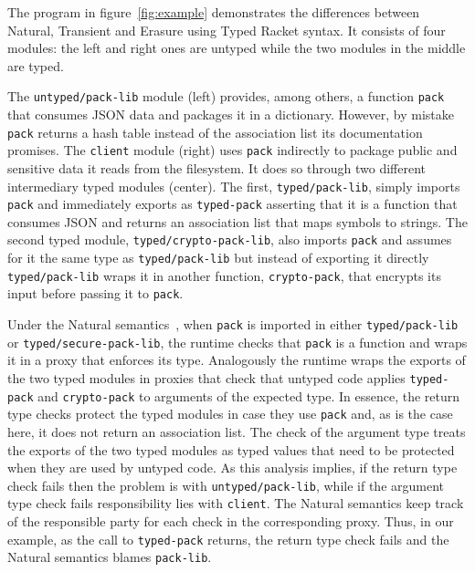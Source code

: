 
The  program in figure~\ref{fig:example} demonstrates the differences
between Natural, Transient and Erasure using Typed Racket syntax.  It
consists of four modules: the left and right ones are untyped while
the two modules in the middle are typed.

The \texttt{untyped/pack-lib} module (left) provides, among
others, a function \texttt{pack} that consumes JSON data and packages it
in a dictionary. However, by mistake \texttt{pack} returns
a hash table instead of the association list its documentation promises.
The \texttt{client} module (right) uses \texttt{pack} indirectly to
package public and sensitive data it reads from the filesystem. It does so
through two different intermediary typed modules (center). The first,
\texttt{typed/pack-lib}, simply imports \texttt{pack} and immediately
exports as \texttt{typed-pack} asserting that it is a function
that consumes JSON and returns an association list that maps symbols to
strings. The second typed module, \texttt{typed/crypto-pack-lib},
also imports \texttt{pack} and assumes for it the same type as
\texttt{typed/pack-lib} but instead of exporting it directly \texttt{typed/pack-lib} wraps it in
another function, \texttt{crypto-pack}, that encrypts its input before
passing it to \texttt{pack}.

Under the Natural semantics~\cite{tf-popl-2008,tfffgksst-snapl-2017}, when
\texttt{pack} is imported in either \texttt{typed/pack-lib} or
\texttt{typed/secure-pack-lib}, the runtime checks that \texttt{pack} is a
function and wraps it in a proxy that enforces its  type.  Analogously
the runtime wraps the exports of the two typed modules in proxies that
check that untyped code applies \texttt{typed-pack} and
\texttt{crypto-pack} to arguments of the expected type. In essence, the
return type checks protect  the typed modules in case they use
\texttt{pack} and, as is the case here, it does not return an association
list. The check of the argument type  treats the
exports of the two typed modules as typed values that need to be protected
when they are used by untyped code.  As this analysis implies, if the
return type check fails then the problem is with
\texttt{untyped/pack-lib}, while if the argument type check fails
responsibility lies with \texttt{client}. The Natural semantics keep track
of the responsible party for each check in the corresponding proxy. Thus,
in our example, as the call to \texttt{typed-pack} returns, the return
type check fails and the Natural semantics blames \texttt{pack-lib}.

